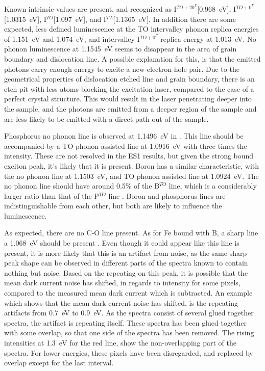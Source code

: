 Known intrinsic values are present, and recognized as I$^{TO+20^\Gamma}$[0.968~eV], I$^{TO+0^\Gamma}$[1.0315~eV], I$^{TO}$[1.097~eV], and I$^{TA}$[1.1365~eV]. In addition there are some expected, less defined luminescence at the TO intervalley phonon replica energies of 1.151~eV and 1.074~eV, and intervalley I$^{TO+0^\Gamma}$ replica energy at 1.013~eV. No phonon luminescence at 1.1545~eV seems to disappear in the area of grain boundary and dislocation line. A possible explanation for this, is that the emitted photons carry enough energy to excite a new electron-hole pair. Due to the geometrical properties of dislocation etched line and grain boundary, there is an etch pit with less atoms blocking the excitation laser, compared to the case of a perfect crystal structure. This would result in the laser penetrating deeper into the sample, and the photons are emitted from a deeper region of the sample and are less likely to be emitted with a direct path out of the sample.


Phosphorus no phonon line is observed at 1.1496~eV in \cite{dean67}. This line should be accompanied by a TO phonon assisted line at 1.0916~eV with three times the intensity. These are not resolved in the ES1 results, but given the strong bound exciton peak, it's likely that it is present. Boron has a similar characteristic, with the no phonon line at 1.1503~eV, and TO phonon assisted line at 1.0924~eV. The no phonon line should have around 0.5\% of the B$^{TO}$ line, which is a considerably larger ratio than that of the P$^{TO}$ line \cite{dean67}. Boron and phosphorus lines are indistinguishable from each other, but both are likely to influence the luminescence. 


As expected, there are no C-O line present. As for Fe bound with B, a sharp line a 1.068~eV should be present \cite{mohring83}. Even though it could appear like this line is present, it is more likely that this is an artifact from noise, as the same sharp peak shape can be observed in different parts of the spectra known to contain nothing but noise. Based on the repeating on this peak, it is possible that the mean dark current noise has shifted, in regards to intensity for some pixels, compared to the measured mean dark current which is subtracted. An example which shows that the mean dark current noise has shifted, is the repeating artifacts from 0.7~eV to 0.9~eV. As the spectra consist of several glued together spectra, the artifact is repeating itself. These spectra has been glued together with some overlap, so that one side of the spectra has been removed. The rising intensities at 1.3~eV for the red line, show the non-overlapping part of the spectra. For lower energies, these pixels have been disregarded, and replaced by overlap except for the last interval.

